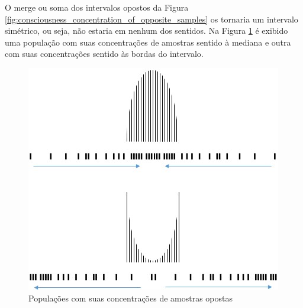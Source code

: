O merge ou soma dos intervalos opostos da Figura \ref{fig:consciousness_concentration_of_opposite_samples} os tornaria um intervalo simétrico, ou seja, não estaria em nenhum dos sentidos.
Na Figura \ref{fig:consciousness_concentration_of_opposite_samples_within_range} é exibido uma população com suas concentrações de amostras sentido à mediana e outra com suas concentrações sentido às bordas do intervalo.
	\begin{figure}[H]
	\caption{Populações com suas concentrações de amostras opostas}
	\label{fig:consciousness_concentration_of_opposite_samples_within_range}
	\centering
	\includegraphics[scale=.7]{sections/images/consciousness_concentration_of_opposite_samples_within_range.jpg}
	\end{figure}

